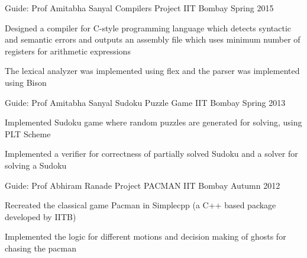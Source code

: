 \begin{cventries}
{      %
    }
    \cventry
    {Guide: Prof Amitabha Sanyal}
    {Compilers Project}
    {IIT Bombay}
    {Spring 2015}
    {
      \begin{cvitems}
        \item {Designed a compiler for C-style programming language which detects syntactic and semantic errors and
            outputs an assembly file which uses minimum number of registers for arithmetic expressions}
        \item{The lexical analyzer was implemented using flex and the parser was implemented using Bison}
      \end{cvitems}
    }
    
    \cventry
    {Guide: Prof Amitabha Sanyal}
    {Sudoku Puzzle Game}
    {IIT Bombay}
    {Spring 2013}
    {
      \begin{cvitems}
        \item {Implemented Sudoku game where random puzzles are generated for solving, using PLT Scheme}
        \item{Implemented a verifier for correctness of partially solved Sudoku and a solver for solving a Sudoku}
      \end{cvitems}
    }
    \cventry
    {Guide: Prof Abhiram Ranade}
    {Project PACMAN}
    {IIT Bombay}
    {Autumn 2012}
    {
      \begin{cvitems}
        \item {Recreated the classical game Pacman in Simplecpp (a C++ based package developed by IITB)}
        \item{Implemented the logic for different motions and decision making of ghosts for chasing the pacman}
      \end{cvitems}
    }
    
    
\end{cventries}
